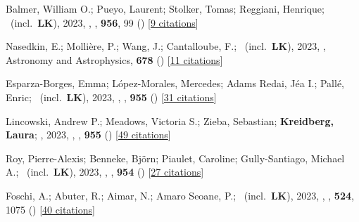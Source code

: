 \item[{\color{numcolor}\scriptsize97}] Balmer, William O.; Pueyo, Laurent; Stolker, Tomas; Reggiani, Henrique; \etal\ (incl.\ \textbf{LK}), 2023, , \apj, \textbf{956}, 99 () [\href{https://ui.adsabs.harvard.edu/abs/2023ApJ...956...99B}{9 citations}]

\item[{\color{numcolor}\scriptsize96}] Nasedkin, E.; Molli{\`e}re, P.; Wang, J.; Cantalloube, F.; \etal\ (incl.\ \textbf{LK}), 2023, , Astronomy and Astrophysics, \textbf{678} () [\href{https://ui.adsabs.harvard.edu/abs/2023A&A...678A..41N}{11 citations}]

\item[{\color{numcolor}\scriptsize95}] Esparza-Borges, Emma; L{\'o}pez-Morales, Mercedes; Adams Redai, J{\'e}a I.; Pall{\'e}, Enric; \etal\ (incl.\ \textbf{LK}), 2023, , \apj, \textbf{955} () [\href{https://ui.adsabs.harvard.edu/abs/2023ApJ...955L..19E}{31 citations}]

\item[{\color{numcolor}\scriptsize94}] Lincowski, Andrew P.; Meadows, Victoria S.; Zieba, Sebastian; \textbf{Kreidberg, Laura}; \etal, 2023, , \apj, \textbf{955} () [\href{https://ui.adsabs.harvard.edu/abs/2023ApJ...955L...7L}{49 citations}]

\item[{\color{numcolor}\scriptsize93}] Roy, Pierre-Alexis; Benneke, Bj{\"o}rn; Piaulet, Caroline; Gully-Santiago, Michael A.; \etal\ (incl.\ \textbf{LK}), 2023, , \apj, \textbf{954} () [\href{https://ui.adsabs.harvard.edu/abs/2023ApJ...954L..52R}{27 citations}]

\item[{\color{numcolor}\scriptsize92}] Foschi, A.; Abuter, R.; Aimar, N.; Amaro Seoane, P.; \etal\ (incl.\ \textbf{LK}), 2023, , \mnras, \textbf{524}, 1075 () [\href{https://ui.adsabs.harvard.edu/abs/2023MNRAS.524.1075F}{40 citations}]

